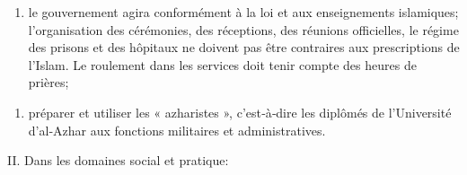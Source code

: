 \begin{enumerate}
\def\labelenumi{\arabic{enumi})}
\item
   
  le gouvernement agira conformément à la loi et aux enseignements
  islamiques; l'organisation des cérémonies, des réceptions, des
  réunions officielles, le régime des prisons et des hôpitaux ne doivent
  pas être contraires aux prescriptions de l'Islam. Le roulement dans
  les services doit tenir compte des heures de prières;
   
\end{enumerate}

\begin{enumerate}
\def\labelenumi{\arabic{enumi})}
\setcounter{enumi}{8}
\item
  préparer et utiliser les « azharistes », c'est‑à‑dire les diplômés de
  l'Université d'al‑Azhar aux fonctions militaires et administratives.
\end{enumerate}

II. Dans les domaines social et pratique:

